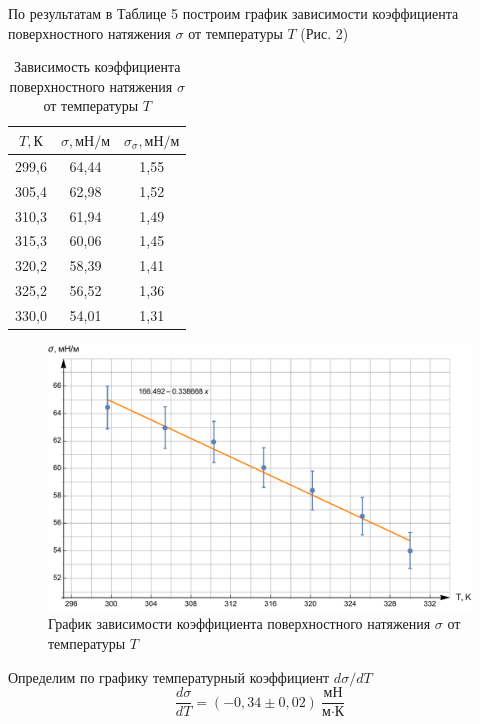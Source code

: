 \documentclass[a4paper,12pt]{article}
\theoremstyle{plain} %
\theoremstyle{definition} %
\theoremstyle{remark} %
\begin{document}
По результатам в Таблице 5 построим график зависимости коэффициента поверхностного натяжения $\sigma$ от температуры $T$ (Рис. 2)
\begin{table}[H]
	\begin{center}
	\begin{tabular}{|c|c|c|}
		\hline
		$T, \text{К}$     & $\sigma, \text{мН}/\text{м}$ & $\sigma_\sigma, \text{мН}/\text{м}$    \\ \hline
		299,6 & 64,44 & 1,55 \\ \hline
		305,4 & 62,98 & 1,52 \\ \hline
		310,3 & 61,94 & 1,49 \\ \hline
		315,3 & 60,06 & 1,45 \\ \hline
		320,2 & 58,39 & 1,41 \\ \hline
		325,2 & 56,52 & 1,36 \\ \hline
		330,0 & 54,01 & 1,31 \\ \hline
	\end{tabular}
			\captionsetup{justification=centering}
\caption{Зависимость коэффициента поверхностного натяжения $\sigma$ от температуры $T$}
\end{center}
\end{table}
\begin{figure}[H]
	\begin{center}
		\includegraphics[width=\linewidth]{2}
					\captionsetup{justification=centering}
		\caption{График зависимости коэффициента поверхностного натяжения $\sigma$ от температуры $T$}
	\end{center}
\end{figure}
Определим по графику температурный коэффициент $d\sigma/dT$
\[\frac{d\sigma}{dT} = (-0,34\pm0,02) \ \frac{\text{мН}}{\text{м}\cdot \text{К}}\]
\end{document}
